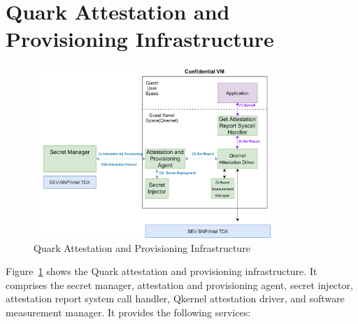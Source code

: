 
\section{Quark Attestation and Provisioning Infrastructure}
\label{sec:design_Quark_Attestation_and_Provisioning_Infrastructure}

\begin{figure}[!htb]
    \centering
    \includegraphics[width=0.8\textwidth]{images/Qkernel_attestation_infrastructurc.png}
    \caption[Quark Attestation and Provisioning Infrastructure]{Quark Attestation and Provisioning Infrastructure}
    \label{fig:Qkernel_attestation_infrastructurc}
\end{figure}


Figure~\ref{fig:Qkernel_attestation_infrastructurc} shows the Quark attestation and provisioning infrastructure. It comprises the secret manager, attestation and provisioning agent, secret injector, attestation report system call handler, Qkernel attestation driver, and software measurement manager. It provides the following services:


